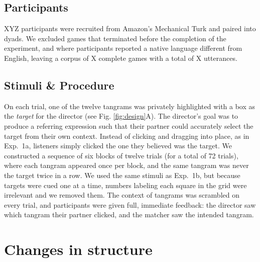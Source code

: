 \documentclass[alpha-refs]{wiley-article}
\begin{document}
\subsection{Participants}\label{participants}

XYZ participants were recruited from Amazon's Mechanical Turk and paired
into dyads. We excluded games that terminated before the completion
of the experiment, and where participants reported a native language different
from English, leaving a corpus of X complete games with a total of
X utterances.

\subsection{Stimuli \& Procedure}\label{stimuli}

On each trial, one of the twelve tangrams was privately highlighted with a box as the \emph{target} for the director (see Fig. \ref{fig:design}A). The director's goal was to produce a referring expression such that their partner could accurately select the target from their own context. Instead of clicking and dragging into place, as in Exp.~1a, listeners simply clicked the one they believed was the target. We constructed a sequence of six blocks of twelve trials (for a total of 72 trials), where each tangram appeared once per block, and the same tangram was never the target twice in a row. We used the same stimuli as Exp.~1b, but because targets were cued one at a time, numbers labeling each square in the grid were irrelevant and we removed them. The context of tangrams was scrambled on every trial, and participants were given full, immediate feedback: the director saw which tangram their partner clicked, and the matcher saw the intended tangram.

\section{Changes in structure}\label{results}
\end{document}
